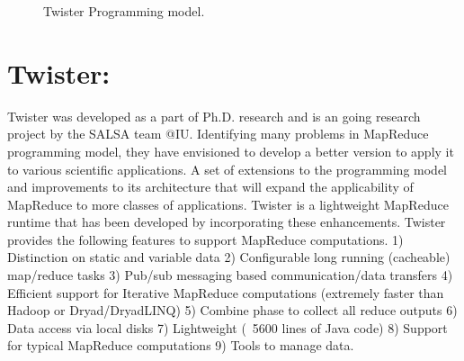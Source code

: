 \documentclass[9pt,twocolumn,twoside]{../../styles/osajnl}
\begin{document}
\begin{figure}[htbp]
\centering
{}
\caption{Twister Programming model.}
\label{fig:Twister Programming model}
\end{figure}


\section{Twister:}

Twister was developed as a part of Ph.D. research and is an going
research project by the SALSA team
@IU\cite{grolinger2014challenges}\cite{dean2008mapreduce}. Identifying
many problems in MapReduce programming model, they have envisioned to
develop a better version to apply it to various scientific
applications\cite{zaharia2010spark}. A set of extensions to the
programming model and improvements to its architecture that will
expand the applicability of MapReduce to more classes of
applications\cite{elsayed2014mapreduce}. Twister is a lightweight
MapReduce runtime that has been developed by incorporating these
enhancements\cite{ekanayake2010twister}\cite{lee2012parallel}. Twister
provides the following features to support MapReduce computations. 1)
Distinction on static and variable data 2) Configurable long running
(cacheable) map/reduce tasks 3) Pub/sub messaging based
communication/data transfers 4) Efficient support for Iterative
MapReduce computations (extremely faster than Hadoop or
Dryad/DryadLINQ) 5) Combine phase to collect all reduce outputs 6)
Data access via local disks 7) Lightweight (~5600 lines of Java code)
8) Support for typical MapReduce computations 9) Tools to manage
data\cite{twister}\cite{doulkeridis2014survey}.
\end{document}
